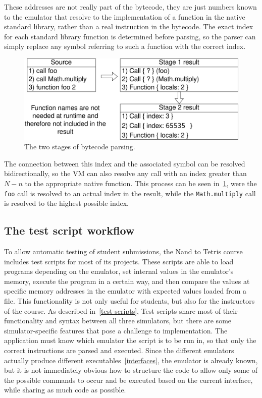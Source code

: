 These addresses are not really part of the bytecode, they are just numbers known to the emulator that resolve to the implementation of a function in the native standard library, rather than a real instruction in the bytecode.
The exact index for each standard library function is determined before parsing, so the parser can simply replace any symbol referring to such a function with the correct index.
\begin{center}
  \begin{figure}[ht]
    \centering
    \includegraphics[width=12cm]{fig/bytecode-parsing.png}
    \caption{The two stages of bytecode parsing.}
    \label{fig:bytecode-parsing}
  \end{figure}
\end{center}
The connection between this index and the associated symbol can be resolved bidirectionally, so the VM can also resolve any call with an index greater than \(N - n\) to the appropriate native function.
This process can be seen in~\cref{fig:bytecode-parsing}, were the \verb+foo+ call is resolved to an actual index in the result, while the \verb+Math.multiply+ call is resolved to the highest possible index.

\subsection{The test script workflow} \label{test-script-workflow}
To allow automatic testing of student submissions, the Nand to Tetris course includes test scripts for most of its projects.
These scripts are able to load programs depending on the emulator, set internal values in the emulator's memory, execute the program in a certain way, and then compare the values at specific memory addresses in the emulator with expected values loaded from a file.
This functionality is not only useful for students, but also for the instructors of the course.
As described in~\cref{test-scripts}, Test scripts share most of their functionality and syntax between all three simulators, but there are some simulator-specific features that pose a challenge to implementation.
The application must know which emulator the script is to be run in, so that only the correct instructions are parsed and executed.
Since the different emulators actually produce different executables~\ref{interfaces}, the emulator is already known, but it is not immediately obvious how to structure the code to allow only some of the possible commands to occur and be executed based on the current interface, while sharing as much code as possible.

